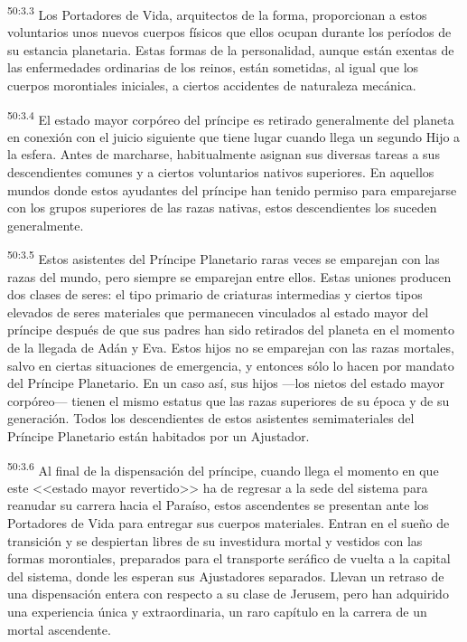 \par
\textsuperscript{50:3.3} Los Portadores de Vida, arquitectos de la forma, proporcionan a estos voluntarios unos nuevos cuerpos físicos que ellos ocupan durante los períodos de su estancia planetaria. Estas formas de la personalidad, aunque están exentas de las enfermedades ordinarias de los reinos, están sometidas, al igual que los cuerpos morontiales iniciales, a ciertos accidentes de naturaleza mecánica.

\par
\textsuperscript{50:3.4} El estado mayor corpóreo del príncipe es retirado generalmente del planeta en conexión con el juicio siguiente que tiene lugar cuando llega un segundo Hijo a la esfera. Antes de marcharse, habitualmente asignan sus diversas tareas a sus descendientes comunes y a ciertos voluntarios nativos superiores. En aquellos mundos donde estos ayudantes del príncipe han tenido permiso para emparejarse con los grupos superiores de las razas nativas, estos descendientes los suceden generalmente.

\par
\textsuperscript{50:3.5} Estos asistentes del Príncipe Planetario raras veces se emparejan con las razas del mundo, pero siempre se emparejan entre ellos. Estas uniones producen dos clases de seres: el tipo primario de criaturas intermedias y ciertos tipos elevados de seres materiales que permanecen vinculados al estado mayor del príncipe después de que sus padres han sido retirados del planeta en el momento de la llegada de Adán y Eva. Estos hijos no se emparejan con las razas mortales, salvo en ciertas situaciones de emergencia, y entonces sólo lo hacen por mandato del Príncipe Planetario. En un caso así, sus hijos ---los nietos del estado mayor corpóreo--- tienen el mismo estatus que las razas superiores de su época y de su generación. Todos los descendientes de estos asistentes semimateriales del Príncipe Planetario están habitados por un Ajustador.

\par
\textsuperscript{50:3.6} Al final de la dispensación del príncipe, cuando llega el momento en que este <<estado mayor revertido>> ha de regresar a la sede del sistema para reanudar su carrera hacia el Paraíso, estos ascendentes se presentan ante los Portadores de Vida para entregar sus cuerpos materiales. Entran en el sueño de transición y se despiertan libres de su investidura mortal y vestidos con las formas morontiales, preparados para el transporte seráfico de vuelta a la capital del sistema, donde les esperan sus Ajustadores separados. Llevan un retraso de una dispensación entera con respecto a su clase de Jerusem, pero han adquirido una experiencia única y extraordinaria, un raro capítulo en la carrera de un mortal ascendente.


